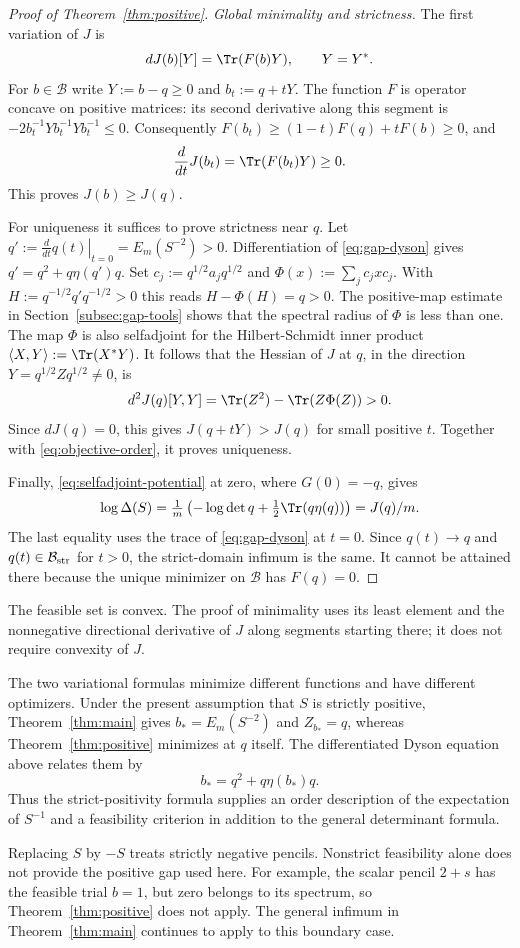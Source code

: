 \begin{proof}[Proof of Theorem~\ref{thm:positive}]
\emph{Global minimality and strictness.}
The first variation of $J$ is
\[
 dJ(b)[Y]=\Tr(F(b)Y),\qquad Y=Y^*.
\]
For $b\in\mathcal B$ write $Y:=b-q\ge0$ and $b_t:=q+tY$.
The function $F$ is operator concave on positive matrices: its second derivative along this segment is $-2b_t^{-1}Yb_t^{-1}Yb_t^{-1}\le0$.
Consequently $F(b_t)\ge(1-t)F(q)+tF(b)\ge0$, and
\begin{equation}\label{eq:objective-order}
 \frac{d}{dt}J(b_t)=\Tr(F(b_t)Y)\ge0.
\end{equation}
This proves $J(b)\ge J(q)$.

For uniqueness it suffices to prove strictness near $q$.
Let $q':=\left.\frac{d}{dt}q(t)\right|_{t=0}=E_m(S^{-2})>0$.
Differentiation of \eqref{eq:gap-dyson} gives $q'=q^2+q\eta(q')q$.
Set $c_j:=q^{1/2}a_jq^{1/2}$ and $\Phi(x):=\sum_jc_jxc_j$.
With $H:=q^{-1/2}q'q^{-1/2}>0$ this reads $H-\Phi(H)=q>0$.
The positive-map estimate in Section~\ref{subsec:gap-tools} shows that the spectral radius of $\Phi$ is less than one.
The map $\Phi$ is also selfadjoint for the Hilbert-Schmidt inner product $\langle X,Y\rangle:=\Tr(X^*Y)$.
It follows that the Hessian of $J$ at $q$, in the direction $Y=q^{1/2}Zq^{1/2}\ne0$, is
\[
 d^2J(q)[Y,Y]=\Tr(Z^2)-\Tr(Z\Phi(Z))>0.
\]
Since $dJ(q)=0$, this gives $J(q+tY)>J(q)$ for small positive $t$.
Together with \eqref{eq:objective-order}, it proves uniqueness.

Finally, \eqref{eq:selfadjoint-potential} at zero, where $G(0)=-q$, gives
\[
 \log\Delta(S)=\tfrac1m\left(-\log\det q
                       +\tfrac12\Tr(q\eta(q))\right)=J(q)/m.
\]
The last equality uses the trace of \eqref{eq:gap-dyson} at $t=0$.
Since $q(t)\to q$ and $q(t)\in\mathcal B_{\rm str}$ for $t>0$, the strict-domain infimum is the same.
It cannot be attained there because the unique minimizer on $\mathcal B$ has $F(q)=0$.
\end{proof}

The feasible set is convex.
The proof of minimality uses its least element and the nonnegative directional derivative of $J$ along segments starting there; it does not require convexity of $J$.


The two variational formulas minimize different functions and have different optimizers.
Under the present assumption that $S$ is strictly positive, Theorem~\ref{thm:main} gives $b_*=E_m(S^{-2})$ and $Z_{b_*}=q$, whereas Theorem~\ref{thm:positive} minimizes at $q$ itself.
The differentiated Dyson equation above relates them by
\begin{equation}\label{eq:optimizer-relation}
 b_*=q^2+q\eta(b_*)q.
\end{equation}
Thus the strict-positivity formula supplies an order description of the expectation of $S^{-1}$ and a feasibility criterion in addition to the general determinant formula.

Replacing $S$ by $-S$ treats strictly negative pencils.
Nonstrict feasibility alone does not provide the positive gap used here.
For example, the scalar pencil $2+s$ has the feasible trial $b=1$, but zero belongs to its spectrum, so Theorem~\ref{thm:positive} does not apply.
The general infimum in Theorem~\ref{thm:main} continues to apply to this boundary case.
